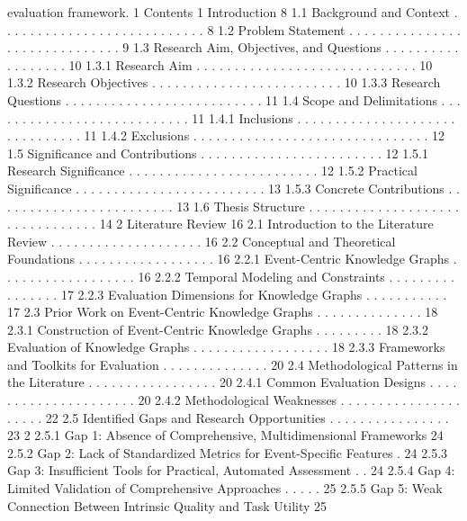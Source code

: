 evaluation framework.
1
Contents
1 Introduction 8
1.1 Background and Context . . . . . . . . . . . . . . . . . . . . . . . . . . . 8
1.2 Problem Statement . . . . . . . . . . . . . . . . . . . . . . . . . . . . . . 9
1.3 Research Aim, Objectives, and Questions . . . . . . . . . . . . . . . . . . 10
1.3.1 Research Aim . . . . . . . . . . . . . . . . . . . . . . . . . . . . . 10
1.3.2 Research Objectives . . . . . . . . . . . . . . . . . . . . . . . . . 10
1.3.3 Research Questions . . . . . . . . . . . . . . . . . . . . . . . . . . 11
1.4 Scope and Delimitations . . . . . . . . . . . . . . . . . . . . . . . . . . . 11
1.4.1 Inclusions . . . . . . . . . . . . . . . . . . . . . . . . . . . . . . . 11
1.4.2 Exclusions . . . . . . . . . . . . . . . . . . . . . . . . . . . . . . . 12
1.5 Significance and Contributions . . . . . . . . . . . . . . . . . . . . . . . . 12
1.5.1 Research Significance . . . . . . . . . . . . . . . . . . . . . . . . . 12
1.5.2 Practical Significance . . . . . . . . . . . . . . . . . . . . . . . . . 13
1.5.3 Concrete Contributions . . . . . . . . . . . . . . . . . . . . . . . . 13
1.6 Thesis Structure . . . . . . . . . . . . . . . . . . . . . . . . . . . . . . . . 14
2 Literature Review 16
2.1 Introduction to the Literature Review . . . . . . . . . . . . . . . . . . . . 16
2.2 Conceptual and Theoretical Foundations . . . . . . . . . . . . . . . . . . 16
2.2.1 Event-Centric Knowledge Graphs . . . . . . . . . . . . . . . . . . 16
2.2.2 Temporal Modeling and Constraints . . . . . . . . . . . . . . . . 17
2.2.3 Evaluation Dimensions for Knowledge Graphs . . . . . . . . . . . 17
2.3 Prior Work on Event-Centric Knowledge Graphs . . . . . . . . . . . . . . 18
2.3.1 Construction of Event-Centric Knowledge Graphs . . . . . . . . . 18
2.3.2 Evaluation of Knowledge Graphs . . . . . . . . . . . . . . . . . . 18
2.3.3 Frameworks and Toolkits for Evaluation . . . . . . . . . . . . . . 20
2.4 Methodological Patterns in the Literature . . . . . . . . . . . . . . . . . 20
2.4.1 Common Evaluation Designs . . . . . . . . . . . . . . . . . . . . . 20
2.4.2 Methodological Weaknesses . . . . . . . . . . . . . . . . . . . . . 22
2.5 Identified Gaps and Research Opportunities . . . . . . . . . . . . . . . . 23
2
2.5.1 Gap 1: Absence of Comprehensive, Multidimensional Frameworks 24
2.5.2 Gap 2: Lack of Standardized Metrics for Event-Specific Features . 24
2.5.3 Gap 3: Insufficient Tools for Practical, Automated Assessment . . 24
2.5.4 Gap 4: Limited Validation of Comprehensive Approaches . . . . . 25
2.5.5 Gap 5: Weak Connection Between Intrinsic Quality and Task Utility 25

